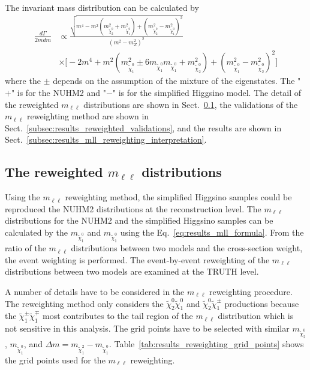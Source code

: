 The invariant mass distribution can be calculated by
%
\begin{align}
    \frac{d\Gamma}{2mdm}
    & \propto \frac{\sqrt{m^{4}-m^{2}(m^{2}_{\widetilde{\chi}^{0}_{2}} + m^{2}_{\widetilde{\chi}^{0}_{1}})+(m^{2}_{\widetilde{\chi}^{0}_{2}} - m^{2}_{\widetilde{\chi}^{0}_{1}})^{2}}}{(m^{2} - m^{2}_{Z})^{2}}\\
    & \times \Big[-2m^{4}+m^{2}(m^{2}_{\widetilde{\chi}^{0}_{1}} \pm 6 m_{\widetilde{\chi}^{0}_{1}} m_{\widetilde{\chi}^{0}_{1}} + m^{2}_{\widetilde{\chi}^{0}_{2}})+(m^{2}_{\widetilde{\chi}^{0}_{1}} - m^{2}_{\widetilde{\chi}^{0}_{2}})^{2}\Big]
    \label{eq:results_mll_formula}
\end{align}
%
where the $\pm$ depends on the assumption of the mixture of the eigenstates.
The "$+$" is for the NUHM2 and "$-$" is for the simplified Higgsino model.
The detail of the reweighted $m_{\ell \ell}$ distributions are shown in Sect.~\ref{subsec:results_reweighted_mll_distributions}, the validations of the $m_{\ell \ell}$ reweighting method are shown in Sect.~\ref{subsec:results_reweighted_validations}, and the results are shown in Sect.~\ref{subsec:results_mll_reweighting_interpretation}.


\subsection{The reweighted $m_{\ell \ell}$ distributions}
\label{subsec:results_reweighted_mll_distributions}
Using the $m_{\ell \ell}$ reweighting method, the simplified Higgsino samples could be reproduced the NUHM2 distributions at the reconstruction level.
The $m_{\ell \ell}$ distributions for the NUHM2 and the simplified Higgsino samples can be calculated by the $m_{\widetilde{\chi}^{0}_{1}}$ and $m_{\widetilde{\chi}^{0}_{1}}$ using the Eq.~\ref{eq:results_mll_formula}.
From the ratio of the $m_{\ell \ell}$ distributions between two models and the cross-section weight, the event weighting is performed.
The event-by-event reweighting of the $m_{\ell \ell}$ distributions between two models are examined at the TRUTH level.

A number of details have to be considered in the $m_{\ell \ell}$ reweighting procedure.
The reweighting method only considers the $\widetilde{\chi}^{0}_{2} \widetilde{\chi}^{0}_{1}$ and $\widetilde{\chi}^{0}_{2} \widetilde{\chi}^{\pm}_{1}$ productions because the $\widetilde{\chi}^{\pm}_{1} \widetilde{\chi}^{\mp}_{1}$ most contributes to the tail region of the $m_{\ell \ell}$ distribution which is not sensitive in this analysis.
The grid points have to be selected with similar $m_{\widetilde{\chi}^{0}_{2}}$, $m_{\widetilde{\chi}^{0}_{1}}$, and $\Delta m = m_{\widetilde{\chi}^{2}_{1}} - m_{\widetilde{\chi}^{0}_{1}}$.
Table~\ref{tab:results_reweighting_grid_points} shows the grid points used for the $m_{\ell \ell}$ reweighting.

